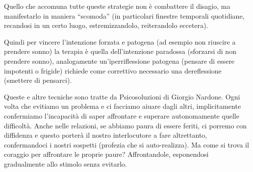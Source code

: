 \documentclass[12pt]{book} %
\begin{document}
\begin{mdframed}[linewidth=1pt]
Quello che accomuna tutte queste strategie non è combattere il disagio, ma manifestarlo in maniera “scomoda” (in
particolari finestre temporali quotidiane, recandosi in un certo luogo, estremizzandolo, reiterandolo eccetera).

Quindi per vincere l'intenzione forzata e patogena (ad esempio non riuscire a prendere sonno) la
terapia è quella dell'intenzione paradossa (sforzarsi di non prendere sonno), analogamente
un'iperriflessione patogena (pensare di essere impotenti o frigide) richiede come correttivo
necessario una dereflessione (smettere di pensarci).

Queste e altre tecniche sono tratte da Psicosoluzioni di Giorgio Nardone. 
Ogni volta che evitiamo un problema e ci facciamo aiuare dagli altri, implicitamente confermiamo l'incapacità di saper affrontare e superare autonomamente quelle difficoltà. Anche nelle relazioni, se abbiamo paura di essere feriti, ci porremo con diffidenza e questo porterà il
nostro interlocutore a fare altrettanto, confermandoci i nostri sospetti (profezia che si auto-realizza). Ma come si
trova il coraggio per affrontare le proprie paure? Affrontandole, esponendosi gradualmente allo stimolo senza evitarlo.
\end{mdframed}
\end{document}
